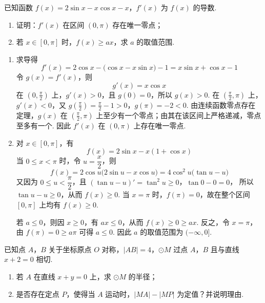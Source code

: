 \begin{problem}
已知函数 \( f(x)=2\sin x-x\cos x-x \)，\( f'(x) \) 为 \( f(x) \) 的导数.

\begin{enumerate}
\item 证明：\( f'(x) \) 在区间 \( (0,\pi) \) 存在唯一零点；
\item 若 \( x\in [0,\pi] \) 时，\( f(x)\ge ax \)，求 \( a \) 的取值范围.
\end{enumerate}
\end{problem}

\begin{solution}
\begin{enumerate}
\item 求导得
\[
f'(x)=2\cos x-\bigl(\cos x-x\sin x\bigr)-1=x\sin x+\cos x-1
\]
令 \(g(x)=f'(x)\)，则
\[
g'(x)=x\cos x
\]
在 \(\left(0,\frac\pi2\right)\) 上，\(g'(x)>0\)，且 \(g(0)=0\)，所以 \(g(x)>0\). 在 \(\left(\frac\pi2,\pi\right)\) 上，\(g'(x)<0\)，又
\(g\left(\frac\pi2\right)=\frac\pi2-1>0\)，\(g(\pi)=-2<0\).
由连续函数零点存在定理，\(g(x)\) 在 \(\left(\frac\pi2,\pi\right)\) 上至少有一个零点；由其在该区间上严格递减，零点至多有一个. 因此 \(f'(x)\) 在 \((0,\pi)\) 上存在唯一零点.

\item 对 \(x\in[0,\pi]\)，有
\[
f(x)=2\sin x-x(1+\cos x)
\]
当 \(0\le x<\pi\) 时，令 \(u=\dfrac{x}{2}\)，则
\[
f(x)=2\cos u\bigl(2\sin u-x\cos u\bigr)=4\cos^2u\bigl(\tan u-u\bigr)
\]
又因为 \(0\le u<\dfrac\pi2\)，且
\((\tan u-u)'=\tan^2u\ge0\)，\(\tan0-0=0\)，
所以 \(\tan u-u\ge0\)，从而 \(f(x)\ge0\). 当 \(x=\pi\) 时，\(f(\pi)=0\)，故在整个区间 \([0,\pi]\) 上均有 \(f(x)\ge0\).

若 \(a\le0\)，则因 \(x\ge0\)，有 \(ax\le0\)，从而 \(f(x)\ge0\ge ax\). 反之，令 \(x=\pi\)，由 \(f(\pi)=0\ge a\pi\) 可得 \(a\le0\). 因此 \(a\) 的取值范围为 \((-\infty,0]\).
\end{enumerate}
\end{solution}

\begin{problem}
已知点 \(A\)，\(B\) 关于坐标原点 \(O\) 对称，\( |AB|=4 \)，\( \odot M \) 过点 \(A\)，\(B\) 且与直线 \( x+2=0 \) 相切.

\begin{enumerate}
\item 若 \(A\) 在直线 \( x+y=0 \) 上，求 \( \odot M \) 的半径；
\item 是否存在定点 \(P\)，使得当 \(A\) 运动时，\( |MA|-|MP| \) 为定值？并说明理由.
\end{enumerate}
\end{problem}

